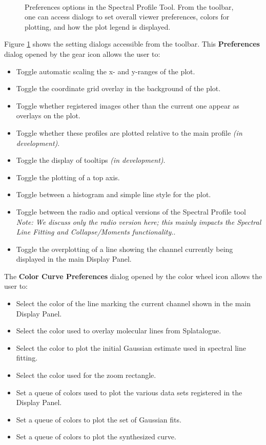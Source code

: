 \begin{figure}[h!]
\begin{center}
\hrulefill \\
\caption{\label{fig:viewer_prefs} Preferences options in the Spectral Profile Tool. From the toolbar, one
can access dialogs to set overall viewer preferences, colors for plotting, and how the plot legend is displayed.}
\hrulefill
\end{center}
\end{figure}

Figure \ref{fig:viewer_prefs} shows the setting dialogs accessible from the toolbar. This {\bf Preferences} dialog opened by the gear icon allows the user to:

\begin{itemize}
\item Toggle automatic scaling the x- and y-ranges of the plot. 
\item Toggle the coordinate grid overlay in the background of the plot.
\item Toggle whether registered images other than the current one appear as overlays on the plot.
\item Toggle whether these profiles are plotted relative to the main profile {\em (in development)}.
\item Toggle the display of tooltips {\em (in development)}.
\item Toggle the plotting of a top axis.
\item Toggle between a histogram and simple line style for the plot.
\item Toggle between the radio and optical versions of the Spectral Profile tool {\em Note: We discuss only the radio version here; this mainly
impacts the Spectral Line Fitting and Collapse/Moments functionality.}.
\item Toggle the overplotting of a line showing the channel currently being displayed in the main Display Panel.
\end{itemize}

The {\bf Color Curve Preferences} dialog opened by the color wheel icon allows the user to:

\begin{itemize}
\item Select the color of the line marking the current channel shown in the main Display Panel.
\item Select the color used to overlay molecular lines from Splatalogue.
\item Select the color to plot the initial Gaussian estimate used in spectral line fitting.
\item Select the color used for the zoom rectangle.
\item Set a queue of colors used to plot the various data sets registered in the Display Panel.
\item Set a queue of colors to plot the set of Gaussian fits.
\item Set a queue of colors to plot the synthesized curve.
\end{itemize}

